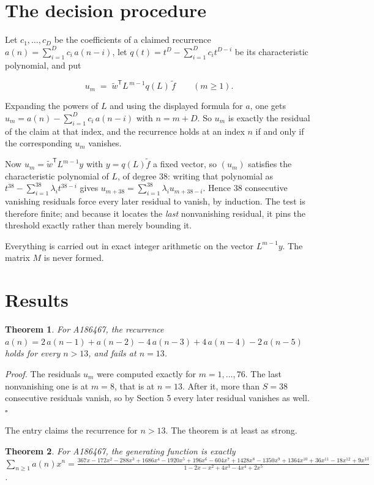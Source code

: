\documentclass[11pt]{article}
\newtheorem{theorem}{Theorem}
\theoremstyle{definition}
\begin{document}
\section{The decision procedure}

Let $c_1,\dots,c_D$ be the coefficients of a claimed recurrence $a(n) = \sum_{i=1}^{D} c_i\,a(n-i)$, let $q(t) = t^{D} - \sum_{i=1}^{D} c_i t^{D-i}$ be its characteristic polynomial, and put

\[u_m \;=\; \tilde w^{\mathsf T} L^{\,m-1} q(L)\,\tilde f \qquad (m \ge 1).\]

Expanding the powers of $L$ and using the displayed formula for $a$, one gets $u_m = a(n) - \sum_{i=1}^{D} c_i\,a(n-i)$ with $n = m + D$. So $u_m$ is exactly the residual of the claim at that index, and the recurrence holds at an index $n$ if and only if the corresponding $u_m$ vanishes.

Now $u_m = \tilde w^{\mathsf T} L^{m-1} y$ with $y = q(L)\tilde f$ a fixed vector, so $(u_m)$ satisfies the characteristic polynomial of $L$, of degree $38$: writing that polynomial as $t^{38} - \sum_{i=1}^{38} \lambda_i t^{38-i}$ gives $u_{m+38} = \sum_{i=1}^{38} \lambda_i u_{m+38-i}$. Hence $38$ consecutive vanishing residuals force every later residual to vanish, by induction. The test is therefore finite; and because it locates the {\itshape last} nonvanishing residual, it pins the threshold exactly rather than merely bounding it.

Everything is carried out in exact integer arithmetic on the vector $L^{m-1}y$. The matrix $M$ is never formed.

\section{Results}

\begin{theorem} For A186467, the recurrence $a(n) = 2\,a(n-1) + a(n-2) - 4\,a(n-3) + 4\,a(n-4) - 2\,a(n-5)$ holds for every $n > 13$, and fails at $n = 13$.\end{theorem}

{\itshape Proof.} The residuals $u_m$ were computed exactly for $m = 1,\dots,76$. The last nonvanishing one is at $m = 8$, that is at $n = 13$. After it, more than $S = 38$ consecutive residuals vanish, so by Section 5 every later residual vanishes as well. $\square$

The entry claims the recurrence for $n > 13$. The theorem is at least as strong.

\begin{theorem} For A186467, the generating function is exactly $\sum_{n\ge 1} a(n)x^n = \frac{367x - 172x^{2} - 288x^{3} + 1686x^{4} - 1920x^{5} + 196x^{6} - 604x^{7} + 1428x^{8} - 1350x^{9} + 1364x^{10} + 36x^{11} - 18x^{12} + 9x^{13}}{1 - 2x - x^{2} + 4x^{3} - 4x^{4} + 2x^{5}}$.\end{theorem}
\end{document}
